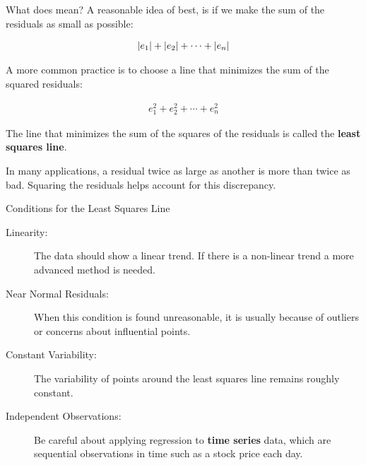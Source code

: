 \documentclass{beamer}
\begin{document}
\begin{frame}
  \begin{block}{What does  mean?}
    A reasonable idea of best, is if we make the sum of the residuals as small as possible:

    \vspace{-4mm}
    \begin{equation*}
      \begin{aligned}
        {\left\lvert e_1\right\rvert}+{\left\lvert e_2\right\rvert}+\cdots+{\left\lvert e_n\right\rvert}
      \end{aligned}
    \end{equation*}\pause

    \vspace{-3mm}
    A more common practice is to choose a line that minimizes the sum of the squared residuals:

    \vspace{-4mm}
    \begin{equation*}
      \begin{aligned}
        e^2_1+e^2_2+\cdots+e^2_n
      \end{aligned}
    \end{equation*}
  \end{block}\pause

  \begin{definition}
    The line that minimizes the sum of the squares of the residuals is called the \textbf{least squares line}.
  \end{definition}\pause

  \begin{note}
    In many applications, a residual twice as large as another is more than twice as bad. Squaring the residuals helps account for this discrepancy.
  \end{note}
\end{frame}

\begin{frame}
  \begin{block}{Conditions for the Least Squares Line}
    \begin{description}
    \item[Linearity:] The data should show a linear trend. If there is a non-linear trend a more advanced method is needed.\pause
    \item[Near Normal Residuals:] When this condition is found unreasonable, it is usually because of outliers or concerns about influential points.\pause
    \item[Constant Variability:] The variability of points around the least squares line remains roughly constant.\pause
    \item[Independent Observations:] Be careful about applying regression to \textbf{time series} data, which are sequential observations in time such as a stock price each day.
    \end{description}
  \end{block}
\end{frame}
\end{document}
